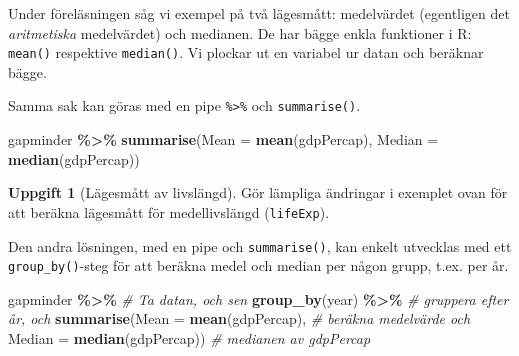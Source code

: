 \documentclass[
]{book}
\newenvironment{Shaded}{\begin{snugshade}}{\end{snugshade}}
\newcommand{\AttributeTok}[1]{\textcolor[rgb]{0.13,0.29,0.53}{#1}}
\newcommand{\CommentTok}[1]{\textcolor[rgb]{0.56,0.35,0.01}{\textit{#1}}}
\newcommand{\FunctionTok}[1]{\textcolor[rgb]{0.13,0.29,0.53}{\textbf{#1}}}
\newcommand{\NormalTok}[1]{#1}
\newcommand{\SpecialCharTok}[1]{\textcolor[rgb]{0.81,0.36,0.00}{\textbf{#1}}}
\theoremstyle{definition}
\theoremstyle{definition}
\theoremstyle{definition}
\newtheorem{exercise}{Uppgift}[chapter]
\theoremstyle{definition}
\theoremstyle{remark}
\begin{document}
Under föreläsningen såg vi exempel på två lägesmått: medelvärdet (egentligen det \emph{aritmetiska} medelvärdet) och medianen. De har bägge enkla funktioner i R: \texttt{mean()} respektive \texttt{median()}. Vi plockar ut en variabel ur datan och beräknar bägge.

\begin{Shaded}
\end{Shaded}

Samma sak kan göras med en pipe \texttt{\%\textgreater{}\%} och \texttt{summarise()}.

\begin{Shaded}
\begin{Highlighting}[]
\NormalTok{gapminder }\SpecialCharTok{\%\textgreater{}\%}
  \FunctionTok{summarise}\NormalTok{(}\AttributeTok{Mean =} \FunctionTok{mean}\NormalTok{(gdpPercap),}
            \AttributeTok{Median =} \FunctionTok{median}\NormalTok{(gdpPercap))}
\end{Highlighting}
\end{Shaded}

\begin{exercise}[Lägesmått av livslängd]
Gör lämpliga ändringar i exemplet ovan för att beräkna lägesmått för medellivslängd (\texttt{lifeExp}).
\end{exercise}

Den andra lösningen, med en pipe och \texttt{summarise()}, kan enkelt utvecklas med ett \texttt{group\_by()}-steg för att beräkna medel och median per någon grupp, t.ex. per år.

\begin{Shaded}
\begin{Highlighting}[]
\NormalTok{gapminder }\SpecialCharTok{\%\textgreater{}\%}                           \CommentTok{\# Ta datan, och sen}
  \FunctionTok{group\_by}\NormalTok{(year) }\SpecialCharTok{\%\textgreater{}\%}                    \CommentTok{\# gruppera efter år, och}
  \FunctionTok{summarise}\NormalTok{(}\AttributeTok{Mean =} \FunctionTok{mean}\NormalTok{(gdpPercap),     }\CommentTok{\# beräkna medelvärde och}
            \AttributeTok{Median =} \FunctionTok{median}\NormalTok{(gdpPercap)) }\CommentTok{\# medianen av gdpPercap}
\end{Highlighting}
\end{Shaded}
\end{document}
